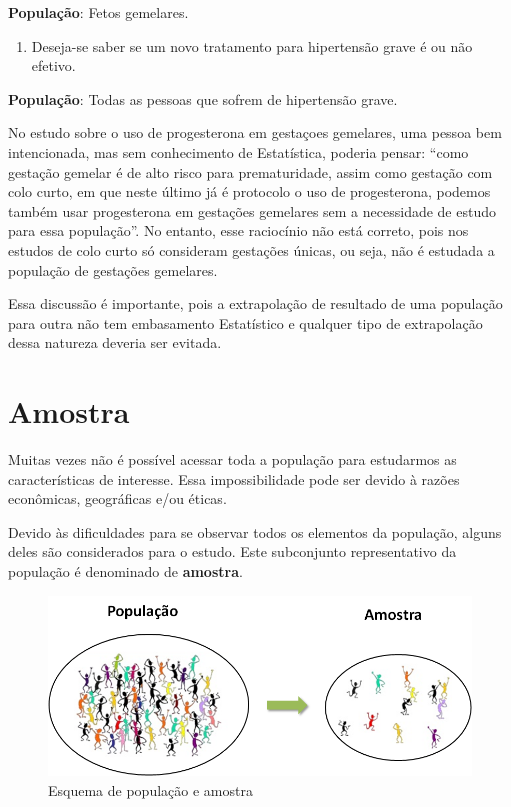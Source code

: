 \documentclass[
]{book}
\providecommand{\tightlist}{%
  \setlength{\itemsep}{0pt}\setlength{\parskip}{0pt}}
\begin{document}
\textbf{População}: Fetos gemelares.

\begin{enumerate}
\def\labelenumi{\arabic{enumi}.}
\setcounter{enumi}{1}
\tightlist
\item
  Deseja-se saber se um novo tratamento para hipertensão grave é ou não efetivo.
\end{enumerate}

\textbf{População}: Todas as pessoas que sofrem de hipertensão grave.

No estudo sobre o uso de progesterona em gestaçoes gemelares, uma pessoa bem intencionada, mas sem conhecimento de Estatística, poderia pensar: ``como gestação gemelar é de alto risco para prematuridade, assim como gestação com colo curto, em que neste último já é protocolo o uso de progesterona, podemos também usar progesterona em gestações gemelares sem a necessidade de estudo para essa população''. No entanto, esse raciocínio não está correto, pois nos estudos de colo curto só consideram gestações únicas, ou seja, não é estudada a população de gestações gemelares.

Essa discussão é importante, pois a extrapolação de resultado de uma população para outra não tem embasamento Estatístico e qualquer tipo de extrapolação dessa natureza deveria ser evitada.

\hypertarget{amostra}{%
\section{Amostra}\label{amostra}}

Muitas vezes não é possível acessar toda a população para estudarmos as características de interesse. Essa impossibilidade pode ser devido à razões econômicas, geográficas e/ou éticas.

Devido às dificuldades para se observar todos os elementos da população, alguns deles são considerados para o estudo. Este subconjunto representativo da população é denominado de \textbf{amostra}.

\begin{figure}
\includegraphics[width=1\linewidth]{figures/esquma_pop_amos} \caption{\label{fig:popamos}Esquema de população e amostra}\label{fig:popAmostra}
\end{figure}
\end{document}
